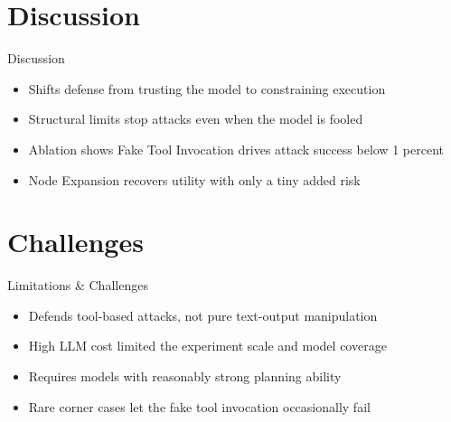 \documentclass[10pt]{beamer}
\begin{document}
\section{Discussion}
\begin{frame}{Discussion}
\begin{itemize}
  \item Shifts defense from trusting the model to constraining execution
  \item Structural limits stop attacks even when the model is fooled
  \item Ablation shows Fake Tool Invocation drives attack success below 1 percent
  \item Node Expansion recovers utility with only a tiny added risk
\end{itemize}
\end{frame}
\section{Challenges}
\begin{frame}{Limitations \& Challenges}
\begin{itemize}
  \item Defends tool-based attacks, not pure text-output manipulation
  \item High LLM cost limited the experiment scale and model coverage
  \item Requires models with reasonably strong planning ability
  \item Rare corner cases let the fake tool invocation occasionally fail
\end{itemize}
\end{frame}
\end{document}
